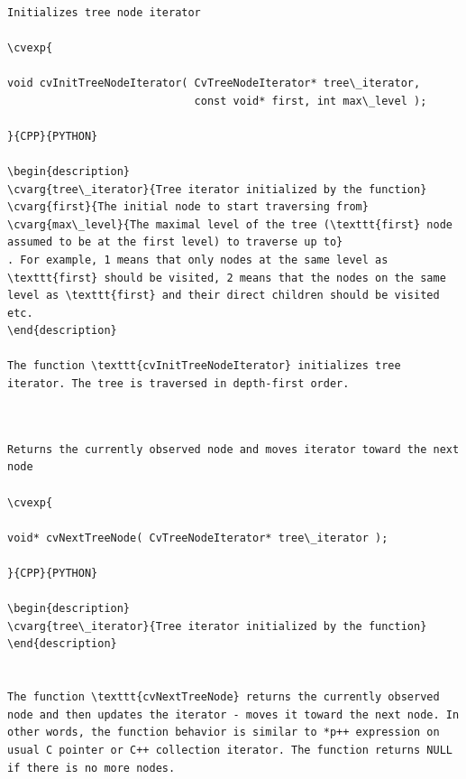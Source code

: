 \begin{verbatim}

Initializes tree node iterator

\cvexp{

void cvInitTreeNodeIterator( CvTreeNodeIterator* tree\_iterator,
                             const void* first, int max\_level );

}{CPP}{PYTHON}

\begin{description}
\cvarg{tree\_iterator}{Tree iterator initialized by the function}
\cvarg{first}{The initial node to start traversing from}
\cvarg{max\_level}{The maximal level of the tree (\texttt{first} node assumed to be at the first level) to traverse up to}
. For example, 1 means that only nodes at the same level as \texttt{first} should be visited, 2 means that the nodes on the same level as \texttt{first} and their direct children should be visited etc.
\end{description}

The function \texttt{cvInitTreeNodeIterator} initializes tree iterator. The tree is traversed in depth-first order.


\end{verbatim}
\label{NextTreeNode}
\begin{verbatim}

Returns the currently observed node and moves iterator toward the next node

\cvexp{

void* cvNextTreeNode( CvTreeNodeIterator* tree\_iterator );

}{CPP}{PYTHON}

\begin{description}
\cvarg{tree\_iterator}{Tree iterator initialized by the function}
\end{description}


The function \texttt{cvNextTreeNode} returns the currently observed node and then updates the iterator - moves it toward the next node. In other words, the function behavior is similar to *p++ expression on usual C pointer or C++ collection iterator. The function returns NULL if there is no more nodes.


\end{verbatim}
\label{PrevTreeNode}
